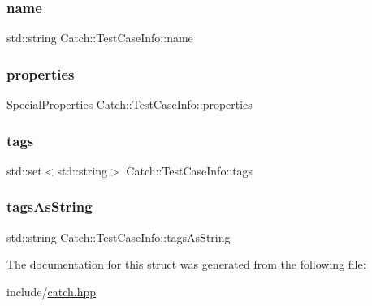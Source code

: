 \subsubsection{\texorpdfstring{name}{name}}
{\footnotesize\ttfamily std\+::string Catch\+::\+Test\+Case\+Info\+::name}

\mbox{\label{struct_catch_1_1_test_case_info_afc1e84bd7a2e180895a06d9131302af0}} 
\subsubsection{\texorpdfstring{properties}{properties}}
{\footnotesize\ttfamily \mbox{\hyperlink{struct_catch_1_1_test_case_info_a39b232f74b4a7a6f2183b96759027eac}{Special\+Properties}} Catch\+::\+Test\+Case\+Info\+::properties}

\mbox{\label{struct_catch_1_1_test_case_info_a045f62e7719a8760a5b456f7fd2dc97c}} 
\subsubsection{\texorpdfstring{tags}{tags}}
{\footnotesize\ttfamily std\+::set$<$std\+::string$>$ Catch\+::\+Test\+Case\+Info\+::tags}

\mbox{\label{struct_catch_1_1_test_case_info_ac65c2d36fd36f71e9bf782b2ea245c64}} 
\subsubsection{\texorpdfstring{tags\+As\+String}{tagsAsString}}
{\footnotesize\ttfamily std\+::string Catch\+::\+Test\+Case\+Info\+::tags\+As\+String}



The documentation for this struct was generated from the following file\+:\begin{DoxyCompactItemize}
\item 
include/\mbox{\hyperlink{catch_8hpp}{catch.\+hpp}}\end{DoxyCompactItemize}
